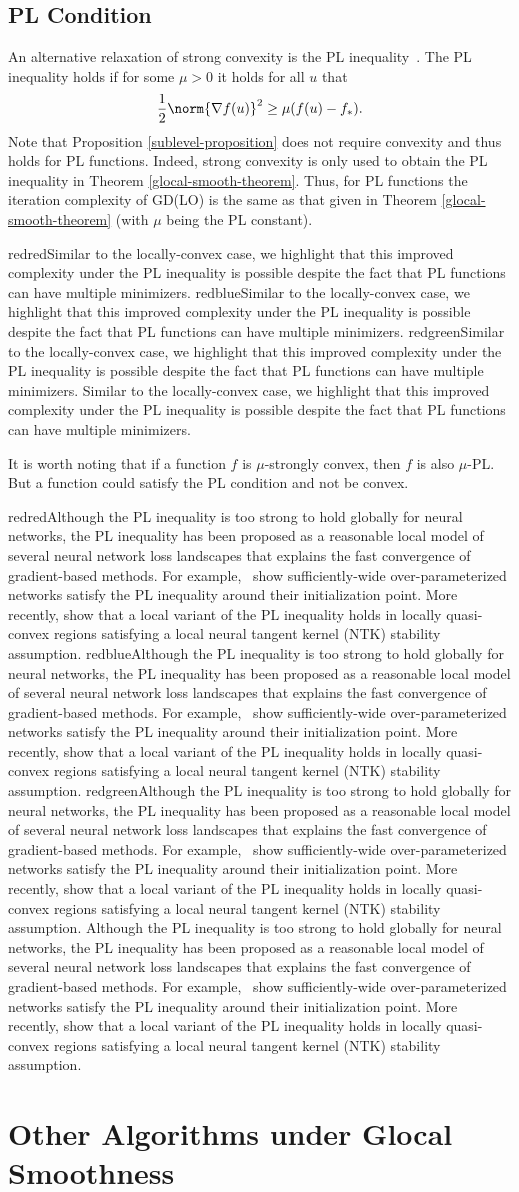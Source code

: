 \documentclass[10pt]{article} %
\newif\ifshowcolours
\def\red{red}
\def\blue{blue}
\def\green{green}
\renewcommand{\textcolor}[2]{%
  \ifshowcolours
    {\color{#1}#2}%
  \else
    \def\temp{#1}%
    \ifx\temp\red     #2\else
    \ifx\temp\blue    #2\else
    \ifx\temp\green   #2\else
        {\color{#1}#2}%
    \fi\fi\fi
  \fi
}
\begin{document}

\subsection{PL Condition}
\label{sec:PL}

An alternative relaxation of strong convexity is
the PL inequality~\cite{polyak1963gradient,KarimiNS16}. The PL inequality holds if for some $\mu > 0$ it holds for all $u$ that
\begin{equation}\label{eq:pl-inequality}
    \frac{1}{2}\norm{\nabla f(u)}^2 \geq \mu(f(u) - f_*).
\end{equation}
Note that Proposition \ref{sublevel-proposition} does not require convexity and thus holds for PL functions. Indeed, strong convexity is only used to obtain the PL inequality in Theorem \ref{glocal-smooth-theorem}. Thus, for PL functions the iteration complexity of GD(LO) is the same as that given in Theorem \ref{glocal-smooth-theorem} (with $\mu$ being the PL constant). \textcolor{red}{Similar to the locally-convex case, we highlight that this improved complexity under the PL inequality is possible despite the fact that PL functions can have multiple minimizers.}

It is worth noting that if a function $f$ is $\mu$-strongly convex, then $f$ is also $\mu$-PL. But a function could satisfy the PL condition and not be convex. \textcolor{red}{Although the PL inequality is too strong to hold globally for neural networks, the PL inequality has been proposed as a reasonable local model of several neural network loss landscapes that explains the fast convergence of gradient-based methods. For example,~\citet{liu2022loss} show sufficiently-wide over-parameterized networks satisfy the PL inequality around their initialization point. More recently, \citet{AichAW26} show that a local variant of the PL inequality holds in locally quasi-convex regions satisfying a local neural tangent kernel (NTK) stability assumption.}


\section{Other Algorithms under Glocal Smoothness}\label{Other-algorithms}
\end{document}
